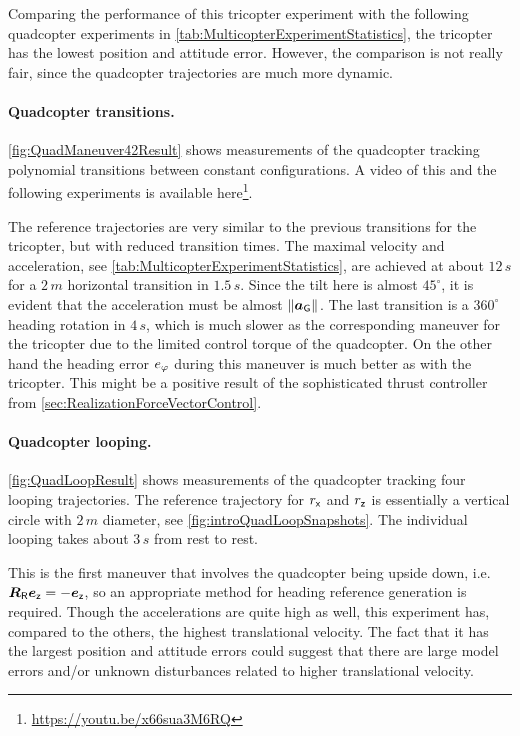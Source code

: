 Comparing the performance of this tricopter experiment with the following quadcopter experiments in \autoref{tab:MulticopterExperimentStatistics}, the tricopter has the lowest position and attitude error.
However, the comparison is not really fair, since the quadcopter trajectories are much more dynamic.

\paragraph{Quadcopter transitions.}
\autoref{fig:QuadManeuver42Result} shows measurements of the quadcopter tracking polynomial transitions between constant configurations.
A video of this and the following experiments is available here\footnote{\url{https://youtu.be/x66sua3M6RQ}}.

The reference trajectories are very similar to the previous transitions for the tricopter, but with reduced transition times.
The maximal velocity and acceleration, see \autoref{tab:MulticopterExperimentStatistics}, are achieved at about $12\,\unit{s}$ for a $2\,\unit{m}$ horizontal transition in $1.5\,\unit{s}$.
Since the tilt here is almost $45^\circ$, it is evident that the acceleration must be almost $\| \boldsymbol{a}_{\mathsf{G}} \|_{}$.
The last transition is a $360^\circ$ heading rotation in $4\,\unit{s}$, which is much slower as the corresponding maneuver for the tricopter due to the limited control torque of the quadcopter.
On the other hand the heading error $e_{\varphi}$ during this maneuver is much better as with the tricopter.
This might be a positive result of the sophisticated thrust controller from \autoref{sec:RealizationForceVectorControl}.

\paragraph{Quadcopter looping.}
\autoref{fig:QuadLoopResult} shows measurements of the quadcopter tracking four looping trajectories.
The reference trajectory for $r_{\mathsf{x}}$ and $r_{\mathsf{z}}$ is essentially a vertical circle with $2\,\unit{m}$ diameter, see \autoref{fig:introQuadLoopSnapshots}.
The individual looping takes about $3\,\unit{s}$ from rest to rest.

This is the first maneuver that involves the quadcopter being upside down, i.e.\ $\boldsymbol{R}_{\mathsf{R}} \boldsymbol{e}_{\mathsf{z}} = -\boldsymbol{e}_{\mathsf{z}}$, so an appropriate method for heading reference generation is required.
Though the accelerations are quite high as well, this experiment has, compared to the others, the highest translational velocity.
The fact that it has the largest position and attitude errors could suggest that there are large model errors and/or unknown disturbances related to higher translational velocity.

